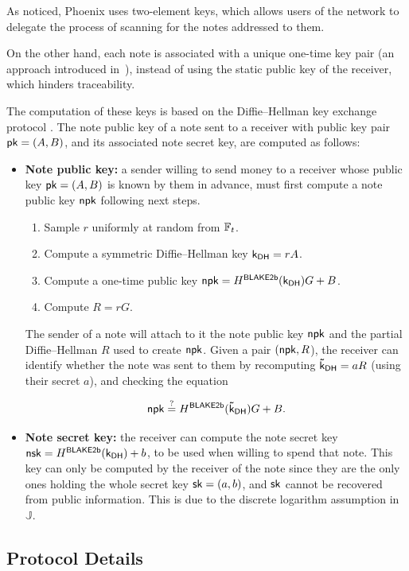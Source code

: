 As noticed, Phoenix uses two-element keys, which allows users of the network to delegate the process of scanning for the notes addressed to them.

On the other hand, each note is associated with a unique one-time key pair (an approach introduced in~\cite{van2013cryptonote}), instead of using the static public key of the receiver, which hinders traceability. 

The computation of these keys is based on the Diffie--Hellman key exchange protocol \cite{diffie1976new}. The note public key of a note sent to a receiver with public key pair $\mathsf{pk} = (A,B)$, and its associated note secret key, are computed as follows:

\begin{itemize}
	\item \textbf{Note public key:} a sender willing to send money to a receiver whose public key $\mathsf{pk} = (A,B)$ is known by them in advance, must first compute a note public key $\mathsf{npk}$ following next steps.

	\begin{enumerate}
		\item Sample $r$ uniformly at random from $\mathbb{F}_t$.
		\item Compute a symmetric Diffie--Hellman key $\mathsf{k_{DH}} = rA$.
		\item Compute a one-time public key $\mathsf{npk} = H^\mathsf{BLAKE2b}(\mathsf{k_{DH}})G + B$.
		\item Compute $R = rG$.
	\end{enumerate}
	
	The sender of a note will attach to it the note public key $\mathsf{npk}$ and the partial Diffie--Hellman $R$ used to create $\mathsf{npk}$. Given a pair $(\mathsf{npk}, R$), the receiver can identify whether the note was sent to them by recomputing $\mathsf{\tilde{k}_{DH}} = aR$ (using their secret $a$), and checking the equation 

	\[\mathsf{npk} \stackrel{?}{=} H^\mathsf{BLAKE2b}(\mathsf{\tilde{k}_{DH}}) G + B.\]
	
	\item \textbf{Note secret key:} the receiver can compute the note secret key $\mathsf{nsk} = H^\mathsf{BLAKE2b}(\mathsf{k_{DH}}) + b$, to be used when willing to spend that note. This key can only be computed by the receiver of the note since they are the only ones holding the whole secret key $\mathsf{sk}=(a,b)$, and $\mathsf{sk}$ cannot be recovered from public information. This is due to the discrete logarithm assumption in $\mathbb{J}$.
\end{itemize}

\subsection{Protocol Details}
\label{sec:transaction-model}

